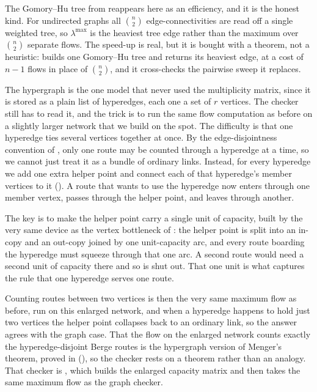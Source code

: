The Gomory--Hu tree from  reappears here as an efficiency, and it is the honest kind. For undirected graphs all $\binom{n}{2}$ edge-connectivities are read off a single weighted tree, so $\lambda^{\max}$ is the heaviest tree edge rather than the maximum over $\binom{n}{2}$ separate flows. The speed-up is real, but it is bought with a theorem, not a heuristic:  builds one Gomory--Hu tree and returns its heaviest edge, at a cost of $n-1$ flows in place of $\binom{n}{2}$, and it cross-checks the pairwise sweep it replaces.

The hypergraph is the one model that never used the multiplicity matrix, since it is stored as a plain list of hyperedges, each one a set of $r$ vertices. The checker still has to read it, and the trick is to run the same flow computation as before on a slightly larger network that we build on the spot. The difficulty is that one hyperedge ties several vertices together at once. By the edge-disjointness convention of , only one route may be counted through a hyperedge at a time, so we cannot just treat it as a bundle of ordinary links. Instead, for every hyperedge we add one extra helper point and connect each of that hyperedge's member vertices to it (). A route that wants to use the hyperedge now enters through one member vertex, passes through the helper point, and leaves through another.

The key is to make the helper point carry a single unit of capacity, built by the very same device as the vertex bottleneck of : the helper point is split into an in-copy and an out-copy joined by one unit-capacity arc, and every route boarding the hyperedge must squeeze through that one arc. A second route would need a second unit of capacity there and so is shut out. That one unit is what captures the rule that one hyperedge serves one route.

Counting routes between two vertices is then the very same maximum flow as before, run on this enlarged network, and when a hyperedge happens to hold just two vertices the helper point collapses back to an ordinary link, so the answer agrees with the graph case. That the flow on the enlarged network counts exactly the hyperedge-disjoint Berge routes is the hypergraph version of Menger's theorem, proved in  (), so the checker rests on a theorem rather than an analogy. That checker is , which builds the enlarged capacity matrix and then takes the same maximum flow as the graph checker.

